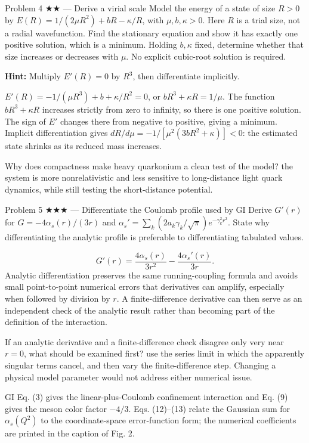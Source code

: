 \documentclass[11pt]{article}
\begin{document}
\begin{problem}{Problem 4 ★★ — Derive a virial scale}
Model the energy of a state of size $R>0$ by
$E(R)=1/(2\mu R^2)+bR-\kappa/R$, with $\mu,b,\kappa>0$.
Here $R$ is a trial size, not a radial wavefunction. Find the stationary
equation and show it has exactly one positive solution, which is a minimum.
Holding $b,\kappa$ fixed, determine whether that size increases or decreases
with $\mu$. No explicit cubic-root solution is required.

\textbf{Hint:} Multiply $E'(R)=0$ by $R^3$, then differentiate implicitly.
\end{problem}
\begin{solution}
$E'(R)=-1/(\mu R^3)+b+\kappa/R^2=0$, or
$bR^3+\kappa R=1/\mu$. The function $bR^3+\kappa R$ increases strictly from zero to infinity,
so there is one positive solution. The sign of $E'$ changes there from
negative to positive, giving a minimum. Implicit differentiation gives
$dR/d\mu=-1/[\mu^2(3bR^2+\kappa)]<0$: the estimated state shrinks as
its reduced mass increases.
\end{solution}
\begin{quiz}
Why does compactness make heavy quarkonium a clean test of the model? \answer
the system is more nonrelativistic and less sensitive to long-distance light
quark dynamics, while still testing the short-distance potential.
\end{quiz}

\begin{problem}{Problem 5 ★★★ — Differentiate the Coulomb profile used by GI}
Derive $G'(r)$ for $G=-4\alpha_s(r)/(3r)$ and
$\alpha_s'=\sum_k(2a_k\gamma_k/\sqrt\pi)e^{-\gamma_k^2r^2}$.
State why differentiating the analytic profile is preferable to differentiating
tabulated values.
\end{problem}
\begin{solution}
\[
G'(r)=\frac{4\alpha_s(r)}{3r^2}-\frac{4\alpha_s'(r)}{3r}.
\]
Analytic differentiation preserves the same running-coupling formula and avoids
small point-to-point numerical errors that derivatives can amplify, especially
when followed by division by $r$. A finite-difference derivative can then serve
as an independent check of the analytic result rather than becoming part of the
definition of the interaction.
\end{solution}
\begin{quiz}
If an analytic derivative and a finite-difference check disagree only very near
$r=0$, what should be examined first? \answer use the series limit in which the
apparently singular terms cancel, and then vary the finite-difference step.
Changing a physical model parameter would not address either numerical issue.
\end{quiz}

\begin{paperbridge}
GI Eq. (3) gives the linear-plus-Coulomb confinement interaction and Eq. (9)
gives the meson color factor $-4/3$. Eqs. (12)--(13) relate the Gaussian sum for
$\alpha_s(Q^2)$ to the coordinate-space error-function form; the numerical
coefficients are printed in the caption of Fig. 2.
\end{paperbridge}
\end{document}
